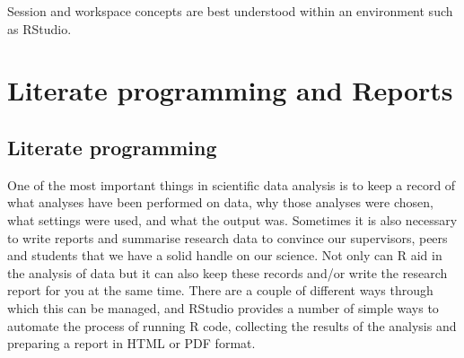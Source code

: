 \documentclass[a4paper]{book}
\begin{document}
Session and workspace concepts are best understood within an environment
such as RStudio.

\section{Literate programming and
Reports}\label{literate-programming-and-reports}

\subsection{Literate programming}\label{literate-programming}

One of the most important things in scientific data analysis is to keep
a record of what analyses have been performed on data, why those
analyses were chosen, what settings were used, and what the output was.
Sometimes it is also necessary to write reports and summarise research
data to convince our supervisors, peers and students that we have a
solid handle on our science. Not only can R aid in the analysis of data
but it can also keep these records and/or write the research report for
you at the same time. There are a couple of different ways through which
this can be managed, and RStudio provides a number of simple ways to
automate the process of running R code, collecting the results of the
analysis and preparing a report in HTML or PDF format.
\end{document}
